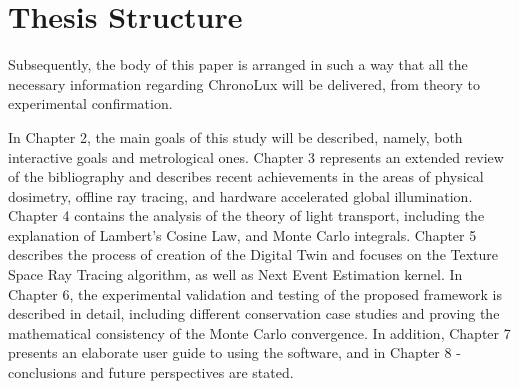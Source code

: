 \section{Thesis Structure}
Subsequently, the body of this paper is arranged in such a way that all the necessary information regarding ChronoLux will be delivered, from theory to experimental confirmation.

In Chapter 2, the main goals of this study will be described, namely, both interactive goals and metrological ones. Chapter 3 represents an extended review of the bibliography and describes recent achievements in the areas of physical dosimetry, offline ray tracing, and hardware accelerated global illumination. Chapter 4 contains the analysis of the theory of light transport, including the explanation of Lambert's Cosine Law, and Monte Carlo integrals. Chapter 5 describes the process of creation of the Digital Twin and focuses on the Texture Space Ray Tracing algorithm, as well as Next Event Estimation kernel. In Chapter 6, the experimental validation and testing of the proposed framework is described in detail, including different conservation case studies and proving the mathematical consistency of the Monte Carlo convergence. In addition, Chapter 7 presents an elaborate user guide to using the software, and in Chapter 8 - conclusions and future perspectives are stated.